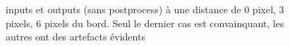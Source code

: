 \documentclass[12pt]{article}
\begin{document}
\begin{figure}[htb]
\centering
  \hfill
  \hfill
  \hfill
  \caption{inputs et outputs (sans postprocess) à une distance de 0 pixel, 3 pixels, 6 pixels du bord. Seul le dernier cas est convainquant, les autres ont des artefacts évidents}\label{fig:occlus_dynamic}
\end{figure}
\end{document}
